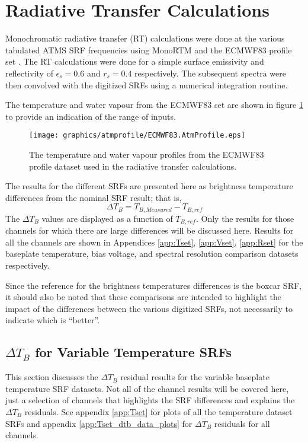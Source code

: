 \section{Radiative Transfer Calculations}
\label{sec:rt}

Monochromatic radiative transfer (RT) calculations were done at the various tabulated ATMS SRF frequencies using MonoRTM \cite{Payne_2008,Clough_2005} and the ECMWF83 profile set \cite{Matricardi_ECMWF564,ECMWF_profile_set2}. The RT calculations were done for a simple surface emissivity and reflectivity of $\epsilon_s=0.6$ and $r_s=0.4$ respectively. The subsequent spectra were then convolved with the digitized SRFs using a numerical integration routine.

The temperature and water vapour from the ECMWF83 set are shown in figure \ref{fig:ECMWF83.AtmProfile} to provide an indication of the range of inputs.

\begin{figure}[htp]
  \centering
  \texttt{[image: graphics/atmprofile/ECMWF83.AtmProfile.eps]}
  \caption{The temperature and water vapour profiles from the ECMWF83 profile dataset used in the radiative transfer calculations.}
  \label{fig:ECMWF83.AtmProfile}
\end{figure}

The results for the different SRFs are presented here as brightness temperature differences from the nominal SRF result; that is,
\begin{equation}
  \Delta T_B = T_{B,Measured} - T_{B,ref} 
\end{equation}
The $\Delta T_B$ values are displayed as a function of $T_{B,ref}$. Only the results for those channels for which there are large differences will be discussed here. Results for all the channels are shown in Appendices \ref{app:Tset}, \ref{app:Vset}, \ref{app:Rset} for the baseplate temperature, bias voltage, and spectral resolution comparison datasets respectively.

Since the reference for the brightness temperatures differences is the boxcar SRF, it should also be noted that these comparisons are intended to highlight the impact of the differences between the various digitized SRFs, not necessarily to indicate which is ``better''.


\subsection{$\Delta T_B$ for Variable Temperature SRFs}
\label{sec:rt.Tset}
This section discusses the $\Delta T_B$ residual results for the variable baseplate temperature SRF datasets. Not all of the channel results will be covered here, just a selection of channels that highlights the SRF differences and explains the $\Delta T_B$ residuals. See appendix \ref{app:Tset} for plots of all the temperature dataset SRFs and appendix \ref{app:Tset_dtb_data_plots} for $\Delta T_B$ residuals for all channels.


